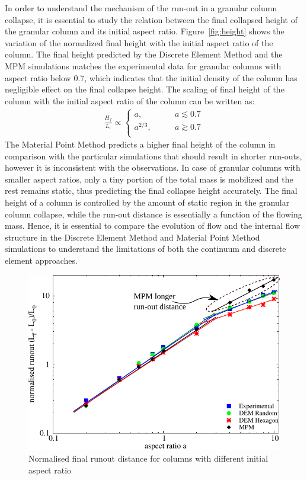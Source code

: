 In order to understand the mechanism of the run-out in a granular column 
collapse, it is essential to study the relation between the final collapsed 
height of the granular column and its initial aspect ratio. 
Figure~\ref{fig:height} shows the variation of the normalized final height with 
the initial aspect ratio of the column. The final height predicted by the 
Discrete Element Method and the MPM simulations matches the experimental data 
for 
granular columns with aspect ratio below 0.7, which indicates that the initial 
density of the column has negligible effect on the final collapse height. The 
scaling of final height of the column with the initial aspect ratio of the 
column can be written as:
\begin{align}
\frac{H_{\textit{f}}}{L_{\textit{i}}} \propto  
\begin{cases}
\textit{a}, \qquad & \textit{a}\lesssim0.7 \\
\textit{a}^{2/3}, \qquad & \textit{a}\gtrsim0.7 \\
\end{cases}
\end{align}
The Material Point Method predicts a higher final height of the column in 
comparison with the particular simulations that should result in shorter 
run-outs, however it is inconsistent with the observations. In case of granular 
columns with smaller aspect ratios, only a tiny portion of the total mass is 
mobilized and the rest remains static, thus predicting the final collapse 
height accurately. The final height of a column is controlled by the amount of 
static region in the granular column collapse, while the run-out distance is 
essentially a function of the flowing mass. Hence, it is essential to compare 
the evolution of flow and the internal flow structure in the Discrete Element 
Method 
and Material Point Method simulations to understand the limitations of both the 
continuum and discrete element approaches.

\begin{figure}[tbhp]
\centering
\includegraphics[width=\textwidth]{runout}
\caption{Normalised final runout distance for columns with different initial 
aspect ratio}
\label{fig:runout}
\end{figure}

